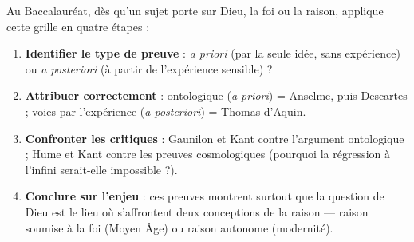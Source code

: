 \documentclass[11pt]{article}
\begin{document}
\begin{methode}
Au Baccalauréat, dès qu'un sujet porte sur Dieu, la foi ou la raison, applique cette grille en quatre étapes :
\begin{enumerate}
\item \textbf{Identifier le type de preuve} : \emph{a priori} (par la seule idée, sans expérience) ou \emph{a posteriori} (à partir de l'expérience sensible) ?
\item \textbf{Attribuer correctement} : ontologique (\emph{a priori}) = Anselme, puis Descartes ; voies par l'expérience (\emph{a posteriori}) = Thomas d'Aquin.
\item \textbf{Confronter les critiques} : Gaunilon et Kant contre l'argument ontologique ; Hume et Kant contre les preuves cosmologiques (pourquoi la régression à l'infini serait-elle impossible ?).
\item \textbf{Conclure sur l'enjeu} : ces preuves montrent surtout que la question de Dieu est le lieu où s'affrontent deux conceptions de la raison — raison soumise à la foi (Moyen Âge) ou raison autonome (modernité).
\end{enumerate}
\end{methode}
\end{document}

